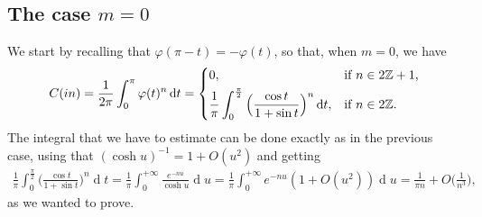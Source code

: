 \documentclass[12pt,a4paper,reqno]{amsart}
\theoremstyle{definition}
\theoremstyle{definition}\newtheorem{defn}[thm]{Definition}
\begin{document}
    \subsection{The case $m=0$}
    We start by recalling that $\varphi(\pi-t)=-\varphi(t)$, so that, when $m=0$, we have
    \[ C(in)=\frac 1{2\pi}\int_0^\pi \varphi(t)^n\operatorname{d}\!t=\begin{dcases*}
    0,&\text{if }$n\in 2\mathbb Z+1$,\\
    \frac 1\pi\int_0^{\frac \pi 2}\Big(\frac{\cos t} {1+\sin t} \Big)^n\operatorname{d}\!t,&\text{if }$n\in 2\mathbb Z$.
    \end{dcases*}\]
    The integral that we have to estimate can be done exactly as in the previous case, using that $(\cosh u)^{-1}=1+O(u^2)$
    and getting
    \begin{align*}
        \frac 1\pi\int_0^{\frac \pi 2}\Big(\frac{\cos t} {1+\sin t} \Big)^n\operatorname{d}\!t=\frac 1\pi\int_0^{+\infty}\frac {e^{-nu}}{\cosh u}\operatorname{d}\!u=\frac 1\pi\int_0^{+\infty}e^{-nu}(1+O(u^2))\operatorname{d}\!u=\frac 1{\pi n}+O\Big(\frac 1{n^3}\Big),
    \end{align*}
    as we wanted to prove.
    
    
    
\end{document}
